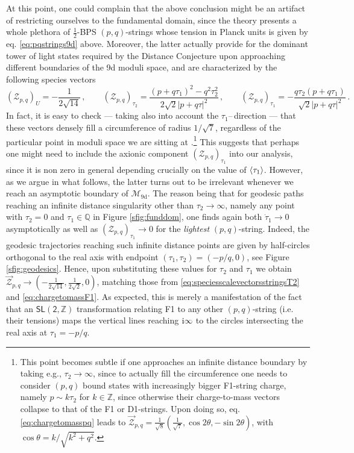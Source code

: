 At this point, one could complain that the above conclusion might be an artifact of restricting ourselves to the fundamental domain, since the theory presents a whole plethora of $\frac{1}{2}$-BPS $(p,q)$-strings whose tension in Planck units is given by eq. \eqref{eq:pqstrings9d} above. Moreover, the latter actually provide for the dominant tower of light states required by the Distance Conjecture upon approaching different boundaries of the 9d moduli space, and are characterized by the following species vectors
%
\begin{equation} \label{eq:chargetomasspq}
\left(\mathcal{Z}_{p,q}\right)_{U} = -\frac{1}{2 \sqrt{14}} \, , \qquad	
 \left(\mathcal{Z}_{p,q}\right)_{\tau_2} = \frac{(p+q\tau_1)^2-q^2\tau_2^2}{2\sqrt{2} |p+q\tau|^2}\, , \qquad \left(\mathcal{Z}_{p,q}\right)_{\tau_1} =  -\frac{q \tau_2 (p+q\tau_1)}{\sqrt{2} |p+q\tau|^2}\, .
\end{equation}
%
In fact, it is easy to check --- taking also into account the $\tau_1$--\,direction --- that these vectors densely fill a circumference of radius $1/\sqrt{7}$, regardless of the particular point in moduli space we are sitting at \cite{Etheredge:2022opl}.\footnote{This point becomes subtle if one approaches an infinite distance boundary by taking e.g., $\tau_2 \to \infty$, since to actually fill the circumference one needs to consider $(p,q)$ bound states with increasingly bigger F1-string charge, namely $p \sim k \tau_2$ for $k\in \mathbb{Z}$, since otherwise their charge-to-mass vectors collapse to that of the F1 or D1-strings. Upon doing so, eq. \eqref{eq:chargetomasspq} leads to $\vec{\mathcal{Z}}_{p,q} = \frac{1}{\sqrt{8}} \left(\frac{1}{\sqrt{7}}, \cos 2\theta, -\sin 2\theta\right)$, with $\cos \theta =k/\sqrt{k^2+q^2}$.} This suggests that perhaps one might need to include the axionic component $\left(\mathcal{Z}_{p,q}\right)_{\tau_1}$ into our analysis, since it is non zero in general depending crucially on the value of $\braket{\tau_1}$. However, as we argue in what follows, the latter turns out to be irrelevant whenever we reach an asymptotic boundary of $\mathcal{M}_{\text{9d}}$. The reason being that for geodesic paths reaching an infinite distance singularity other than $\tau_2 \to \infty$, namely any point with $\tau_2=0$ and $\tau_1 \in \mathbb{Q}$ in Figure \ref{sfig:funddom}, one finds again both $\dot \tau_1 \to 0$ asymptotically as well as $\left(\mathcal{Z}_{p,q}\right)_{\tau_1} \to 0$ for the \emph{lightest} $(p,q)$-string. Indeed, the geodesic trajectories reaching such infinite distance points are given by half-circles orthogonal to the real axis with endpoint $(\tau_1, \tau_2)=(-p/q,0)$, see Figure \ref{sfig:geodesics}. Hence, upon substituting these values for $\tau_2$ and $\tau_1$ we obtain $\vec{\mathcal{Z}}_{p,q} \to \left(-\frac{1}{2 \sqrt{14}}, \frac{1}{2\sqrt{2}}, 0 \right)$, matching those from \eqref{eq:speciesscalevectorsstringsT2} and \eqref{eq:chargetomassF1}. As expected, this is merely a manifestation of the fact that an $\mathsf{SL(2, \mathbb{Z})}$ transformation relating F1 to any other $(p,q)$-string (i.e. their tensions) maps the vertical lines reaching $\text{i}\infty$ to the circles intersecting the real axis at $\tau_1=-p/q$.

